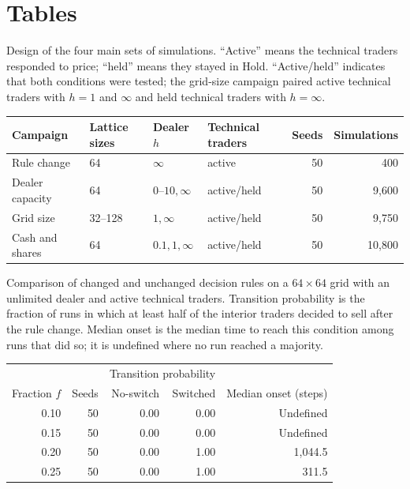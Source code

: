 \section*{Tables}
\setcounter{table}{0}
\renewcommand{\thetable}{S\arabic{table}}

\begin{center}
\begin{minipage}{\linewidth}\centering
\captionsetup{type=table,hypcap=false}
\caption{Design of the four main sets of simulations. ``Active'' means the
technical traders responded to price; ``held'' means they stayed in Hold.
``Active/held'' indicates that both conditions were tested; the grid-size
campaign paired active technical traders with $h=1$ and $\infty$ and held
technical traders with $h=\infty$.}
\label{tab:campaigns}
\small
\begin{tabular}{llllrr}
\toprule
Campaign & Lattice sizes & Dealer $h$ & Technical traders & Seeds & Simulations \\
\midrule
Rule change & 64 & $\infty$ & active & 50 & 400 \\
Dealer capacity & 64 & $0$--$10,\infty$ & active/held & 50 & 9,600 \\
Grid size & 32--128 & $1,\infty$ & active/held & 50 & 9,750 \\
Cash and shares & 64 & $0.1,1,\infty$ & active/held & 50 & 10,800 \\
\bottomrule
\end{tabular}
\end{minipage}
\end{center}

\begin{center}
\begin{minipage}{\linewidth}
\centering
\captionsetup{type=table,hypcap=false}
\caption{Comparison of changed and unchanged decision rules on a $64\times64$
grid with an unlimited dealer and active technical traders.
Transition probability is the fraction of runs in which at least half
of the interior traders decided to sell after the rule change. Median
onset is the median time to reach this condition among runs that did
so; it is undefined where no run reached a majority.}
\label{tab:paired-switch}
\small
\begin{tabular}{rrrrr}
\toprule
 & & \multicolumn{2}{c}{Transition probability} & \\
\cmidrule(lr){3-4}
Fraction $f$ & Seeds & No-switch & Switched & Median onset (steps) \\
\midrule
0.10 & 50 & 0.00 & 0.00 & Undefined \\
0.15 & 50 & 0.00 & 0.00 & Undefined \\
0.20 & 50 & 0.00 & 1.00 & 1{,}044.5 \\
0.25 & 50 & 0.00 & 1.00 & 311.5 \\
\bottomrule
\end{tabular}
\end{minipage}
\end{center}

